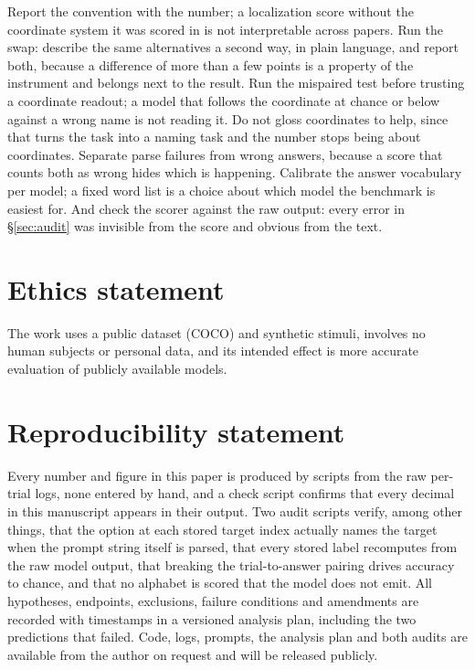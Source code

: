 \documentclass{article}
\begin{document}
Report the convention with the number; a localization score without the
coordinate system it was scored in is not interpretable across papers. Run the
swap: describe the same alternatives a second way, in plain language, and report
both, because a difference of more than a few points is a property of the
instrument and belongs next to the result. Run the mispaired test before trusting
a coordinate readout; a model that follows the coordinate at chance or below
against a wrong name is not reading it. Do not gloss coordinates to help, since
that turns the task into a naming task and the number stops being about
coordinates. Separate parse failures from wrong answers, because a score that
counts both as wrong hides which is happening. Calibrate the answer vocabulary per
model; a fixed word list is a choice about which model the benchmark is easiest
for. And check the scorer against the raw output: every error in
\S\ref{sec:audit} was invisible from the score and obvious from the text.

\section*{Ethics statement}

The work uses a public dataset (COCO) and synthetic stimuli, involves no human
subjects or personal data, and its intended effect is more accurate evaluation of
publicly available models.

\section*{Reproducibility statement}

Every number and figure in this paper is produced by scripts from the raw per-trial logs, none entered by hand, and a check script confirms that every decimal in this manuscript appears in their output. Two audit scripts verify, among other
things, that the option at each stored target index actually names the target when
the prompt string itself is parsed, that every stored label recomputes from the raw
model output, that breaking the trial-to-answer pairing drives accuracy to chance,
and that no alphabet is scored that the model does not emit. All hypotheses,
endpoints, exclusions, failure conditions and amendments are recorded with
timestamps in a versioned analysis plan, including the two predictions that failed. Code, logs, prompts, the analysis plan and both audits are available from the author on request and will be released publicly.
\end{document}

